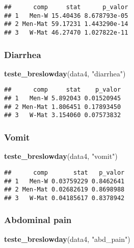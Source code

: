 \documentclass[
]{article}
\newenvironment{Shaded}{\begin{snugshade}}{\end{snugshade}}
\newcommand{\KeywordTok}[1]{\textcolor[rgb]{0.13,0.29,0.53}{\textbf{#1}}}
\newcommand{\NormalTok}[1]{#1}
\newcommand{\StringTok}[1]{\textcolor[rgb]{0.31,0.60,0.02}{#1}}
\begin{document}
\begin{verbatim}
##      comp     stat      p_valor
## 1   Men-W 15.40436 8.678793e-05
## 2 Men-Mat 59.17231 1.443290e-14
## 3   W-Mat 46.27470 1.027822e-11
\end{verbatim}

\hypertarget{diarrhea-3}{%
\subsubsection{Diarrhea}\label{diarrhea-3}}

\begin{Shaded}
\begin{Highlighting}[]
\KeywordTok{teste_breslowday}\NormalTok{(data4, }\StringTok{"diarrhea"}\NormalTok{)}
\end{Highlighting}
\end{Shaded}

\begin{verbatim}
##      comp     stat    p_valor
## 1   Men-W 5.892043 0.01520945
## 2 Men-Mat 1.806451 0.17893450
## 3   W-Mat 3.154060 0.07573832
\end{verbatim}

\hypertarget{vomit-3}{%
\subsubsection{Vomit}\label{vomit-3}}

\begin{Shaded}
\begin{Highlighting}[]
\KeywordTok{teste_breslowday}\NormalTok{(data4, }\StringTok{"vomit"}\NormalTok{)}
\end{Highlighting}
\end{Shaded}

\begin{verbatim}
##      comp       stat   p_valor
## 1   Men-W 0.03759229 0.8462641
## 2 Men-Mat 0.02682619 0.8698988
## 3   W-Mat 0.04185617 0.8378942
\end{verbatim}

\hypertarget{abdominal-pain-3}{%
\subsubsection{Abdominal pain}\label{abdominal-pain-3}}

\begin{Shaded}
\begin{Highlighting}[]
\KeywordTok{teste_breslowday}\NormalTok{(data4, }\StringTok{"abd_pain"}\NormalTok{)}
\end{Highlighting}
\end{Shaded}
\end{document}
